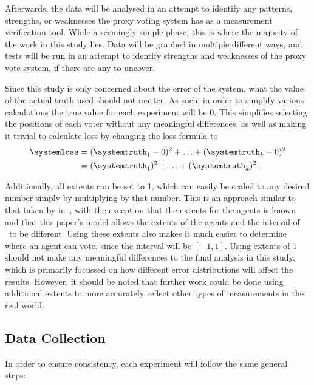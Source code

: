 Afterwards, the data will be analysed in an attempt to identify any patterns,
strengths, or weaknesses the proxy voting system has as a measurement verification tool.
While a seemingly simple phase, this is where the majority of the work in this study
lies.
Data will be graphed in multiple different ways, and tests will be run in an attempt to
identify strengths and weaknesses of the proxy vote system, if there are any to uncover.

Since this study is only concerned about the error of the system, what the value of the
actual truth used should not matter.
As such, in order to simplify various calculations the true value for each experiment
will be 0.
This simplifies selecting the positions of each voter without any meaningful
differences, as well as making it trivial to calculate loss by changing the
\hyperref[eq:loss]{loss formula} to
\begin{align}
    \systemloss &=
    (\systemtruth_1 - 0)^2 +
    \mathellipsis +
    (\systemtruth_k - 0)^2
    \nonumber \\
    &=
    (\systemtruth_1)^2 +
    \mathellipsis +
    (\systemtruth_k )^2
    \text{.}\label{eq:adjusted-loss}
\end{align}


Additionally, all extents can be set to 1, which can easily be scaled to any
desired number simply by multiplying by that number.
This is an approach similar to that taken by  in~\cite{Cohensius2017},
with the exception that the extents for the agents is known and that this paper's model
allows the extents of the agents and the interval of \systemspace\ to be different.
Using these extents also makes it much easier to determine where an agent
can vote, since the interval will be $[-1, 1]$.
Using extents of 1 should not make any meaningful differences to the final
analysis in this study, which is primarily focussed on how different error
distributions will affect the results.
However, it should be noted that further work could be done using additional extents
to more accurately reflect other types of measurements in the real world.

\subsection{Data Collection}\label{subsec:data-collection}
In order to ensure consistency, each experiment will follow the same general
steps:

